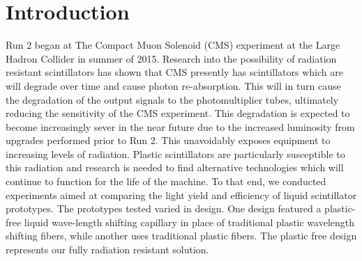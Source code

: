 \documentclass[review]{elsarticle}
\begin{document}
\section{Introduction}
\label{sec:introduction}
Run 2 began at The Compact Muon Solenoid (CMS) experiment at the Large Hadron Collider in summer of 2015. 
Research into the possibility of radiation resistant scintillators has shown that CMS presently has scintillators which are will degrade over time and cause photon re-absorption.
This will in turn cause the degradation of the output signals to the photomultiplier tubes, ultimately reducing the sensitivity of the CMS experiment. 
This degradation is expected to become increasingly sever in the near future due to the increased luminosity from upgrades performed prior to Run 2. 
This unavoidably exposes equipment to increasing levels of radiation. 
Plastic scintillators are particularly susceptible to this radiation and research is needed to find alternative technologies which will continue to function for the life of the machine. 
To that end, we conducted experiments aimed at comparing the light yield and efficiency of liquid scintillator prototypes.
The prototypes tested varied in design. One design featured a plastic-free liquid wave-length shifting capillary in place of traditional plastic wavelength shifting fibers, 
while another uses traditional plastic fibers. 
The plastic free design represents our fully radiation resistant solution.
\end{document}
